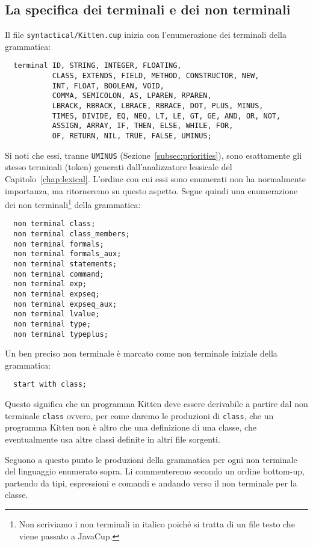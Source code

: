 \subsection{La specifica dei terminali e dei non terminali}
  \label{subsec:terminals}
%
Il file \texttt{syntactical/Kitten.cup}
inizia con l'enumerazione dei terminali della grammatica:
%
\begin{verbatim}
  terminal ID, STRING, INTEGER, FLOATING,
           CLASS, EXTENDS, FIELD, METHOD, CONSTRUCTOR, NEW,
           INT, FLOAT, BOOLEAN, VOID,
           COMMA, SEMICOLON, AS, LPAREN, RPAREN,
           LBRACK, RBRACK, LBRACE, RBRACE, DOT, PLUS, MINUS,
           TIMES, DIVIDE, EQ, NEQ, LT, LE, GT, GE, AND, OR, NOT,
           ASSIGN, ARRAY, IF, THEN, ELSE, WHILE, FOR,
           OF, RETURN, NIL, TRUE, FALSE, UMINUS;
\end{verbatim}
%
Si noti che essi, tranne \texttt{UMINUS} (Sezione~\ref{subsec:priorities}),
sono esattamente gli stesso terminali (token) generati
dall'analizzatore lessicale del Capitolo~\ref{chap:lexical}. L'ordine
con cui essi sono enumerati non ha normalmente importanza, ma
ritorneremo su questo aspetto.
Segue quindi una enumerazione dei non terminali\footnote{
Non scriviamo i non terminali
in italico poich\'e si tratta di un file testo che viene passato a JavaCup.}
della grammatica:
%
\begin{verbatim}
  non terminal class;
  non terminal class_members;
  non terminal formals;
  non terminal formals_aux;
  non terminal statements;
  non terminal command;
  non terminal exp;
  non terminal expseq;
  non terminal expseq_aux;
  non terminal lvalue;
  non terminal type;
  non terminal typeplus;
\end{verbatim}
%
Un ben preciso non terminale \`e marcato come non terminale iniziale della
grammatica:
%
\begin{verbatim}
  start with class;
\end{verbatim}
%
Questo significa che un programma Kitten deve essere derivabile a partire
dal non terminale \texttt{class} ovvero, per come daremo le produzioni di
\texttt{class}, che un programma Kitten non \`e altro che una definizione
di una classe, che eventualmente usa altre classi definite in altri file
sorgenti.

Seguono a questo punto le produzioni della grammatica per ogni non terminale
del linguaggio enumerato sopra. Li commenteremo secondo un ordine bottom-up,
partendo \cioe da tipi, espressioni e comandi e andando verso
il non terminale per la classe.
%
